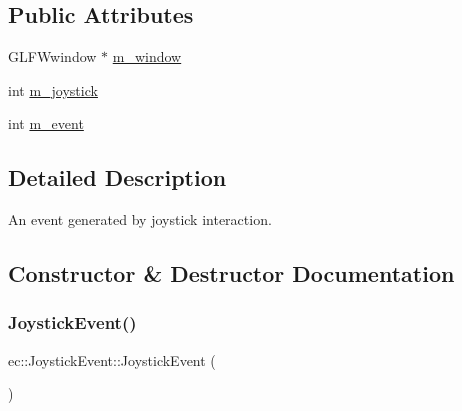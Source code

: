\subsection*{Public Attributes}
\begin{DoxyCompactItemize}
\item 
G\+L\+F\+Wwindow $\ast$ \mbox{\hyperlink{structec_1_1_joystick_event_a9b108de0a7db9268dd11642a203ef816}{m\+\_\+window}}
\item 
int \mbox{\hyperlink{structec_1_1_joystick_event_a415b6d2d801b41db8f3dee6b2be35448}{m\+\_\+joystick}}
\item 
int \mbox{\hyperlink{structec_1_1_joystick_event_acf4361edcb473cbf0567137224c86f2a}{m\+\_\+event}}
\end{DoxyCompactItemize}


\subsection{Detailed Description}
An event generated by joystick interaction. 

\subsection{Constructor \& Destructor Documentation}
\mbox{\label{structec_1_1_joystick_event_a04113c84c127415b3937c214b3e6eb92}} 
\subsubsection{\texorpdfstring{Joystick\+Event()}{JoystickEvent()}\hspace{0.1cm}{\footnotesize\ttfamily [1/2]}}
{\footnotesize\ttfamily ec\+::\+Joystick\+Event\+::\+Joystick\+Event (\begin{DoxyParamCaption}{ }\end{DoxyParamCaption})\hspace{0.3cm}{\ttfamily [explicit]}}

\mbox{\label{structec_1_1_joystick_event_ae08b4530293362fa1ecf1446f13e91e7}} 
